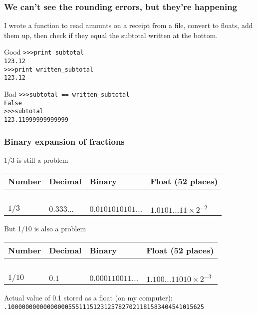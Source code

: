 \documentclass{beamer}
\begin{document}
\begin{frame}\frametitle{We can't see the rounding errors, but they're happening}
I wrote a function to read amounts on a receipt from a file, convert to floats, add them up, then check if they equal the subtotal written at the bottom.

\begin{block}{Good}
\texttt{>>>print subtotal}\\
\texttt{123.12}\\
\texttt{>>>print written\_subtotal}\\
\texttt{123.12}\\
\end{block}
\pause
\begin{block}{Bad}
\texttt{>>>subtotal == written\_subtotal}\\
\texttt{False}\\
\texttt{>>>subtotal}\\
\texttt{123.11999999999999}
\end{block}

\end{frame}

\begin{frame}\frametitle{Binary expansion of fractions}

\begin{block}{1/3 is still a problem}
~\\
\begin{tabular}{l | l | l | l}
Number & Decimal & Binary & Float (52 places)\\
\hline
~&~&~&~\\

$1/3$ &$0.333...$& $0.0101010101...$ & $1.0101\ldots 11 \times 2^{-2}$
\end{tabular}
\end{block}
\pause

\begin{block}{But 1/10 is also a problem}
~\\
\begin{tabular}{l | l | l | l}
Number & Decimal & Binary & Float (52 places)\\
\hline
~&~&~&~\\

$1/10$ & $0.1$ & $0.000110011\ldots$ & $1.100...11010 \times 2^{-3}$  \\ 
\end{tabular}
\end{block}
\pause
\begin{block}{Actual value of 0.1 stored as a float (on my computer):}
{\fontsize{0.9em}{0.9em}
\texttt{.1000000000000000055511151231257827021181583404541015625}
}
\end{block}
\end{frame}
\end{document}
